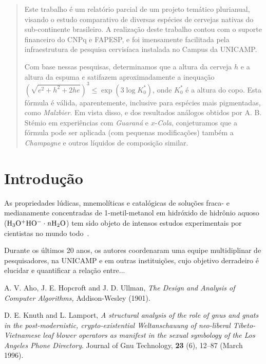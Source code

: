 \documentclass[11pt,twoside]{article}
\begin{document}
\begin{abstract} 
  Este trabalho é um relatório parcial de um projeto temático 
  plurianual, visando o estudo comparativo de diversas espécies de
  cervejas nativas do sub-continente brasileiro.  A realização deste
  trabalho contou com o suporte financeiro do CNPq e FAPESP, e foi
  imensamente facilitada pela infraestrutura de pesquisa cervisíaca
  instalada no Campus da UNICAMP.

  Com base nessas pesquisas, determinamos que a altura da cerveja $h$
  e a altura da espuma $e$ satifazem aproximadamente a inequação
  $(\sqrt{e^2 + h^2 + 2 h e})^3 \leq \exp(3 \log K_0^\ast)$, onde
  $K_0^\ast$ é a altura do copo.  Esta fórmula é válida,
  aparentemente, inclusive para espécies mais pigmentadas, como {\em
  Malzbier}.  Em vista disso, e dos resultados análogos obtidos por
  A. B. Stémio em experiências com {\em Guaraná} e $x$-{\em Cola},
  conjeturamos que a fórmula pode ser aplicada (com pequenas
  modificações) também a {\em Champagne} e outros líquidos de
  composição similar.
\end{abstract}

\section{Introdução}

  As propriedades lúdicas, mnemolíticas e catalógicas de 
  soluções fraca- e medianamente concentradas de 1-metil-metanol
  em hidróxido de hidrônio aquoso ($\rm H_3O^{+} HO^{-}\cdot {\mathit n}H_2O$)
  tem sido objeto de intensos estudos experimentais por
  cientistas no mundo todo~\cite{AHU,KNU}.
  
  Durante os últimos 20 anos, os autores coordenaram uma equipe
  multidiplinar de pesquisadores, na UNICAMP e em outras instituições,
  cujo objetivo derradeiro é elucidar e quantificar a relação entre...

\begin{thebibliography}{99}

 A. V. Aho, J. E. Hopcroft and J.  D.  Ullman, {\it The
Design and Analysis of Computer Algorithms,} Addison-Wesley (1901).

 D. E. Knuth and L. Lamport, {\it A structural analysis
of the role of gnus and gnats in the post-modernistic, crypto-existential 
Weltanschauung of neo-liberal Tibeto-Vietnamese leaf blower operators 
as manifest in the sexual symbology of the Los Angeles Phone Directory}.
Journal of Gnu Technology, {\bf 23} (6), 12--87
(March 1996).

\end{thebibliography}
\end{document}

